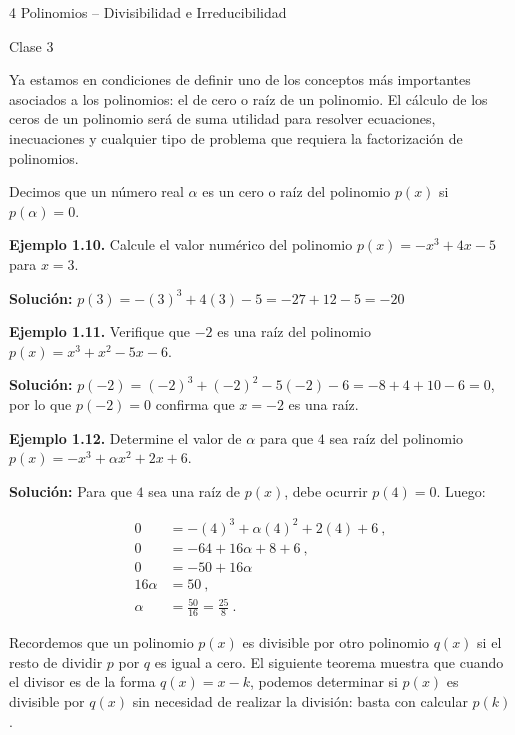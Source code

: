 \documentclass[11pt]{article}
\theoremstyle{plain}
\theoremstyle{definition}
\theoremstyle{definition}
\begin{document}
\begin{multicols}{4}
Polinomios – Divisibilidad e Irreducibilidad

Clase 3

Ya estamos en condiciones de definir uno de los conceptos más importantes asociados a los polinomios: el de cero o raíz de un polinomio. El cálculo de los ceros de un polinomio será de suma utilidad para resolver ecuaciones, inecuaciones y cualquier tipo de problema que requiera la factorización de polinomios.

\begin{tcolorbox}[colback=blue!5!white,colframe=blue!75!black,title=\textbf{Definición (Cero o raíz de un polinomio)}]
Decimos que un número real $\alpha$ es un cero o raíz del polinomio $p(x)$ si $p(\alpha) = 0$.
\end{tcolorbox}

\noindent\textbf{Ejemplo 1.10.} Calcule el valor numérico del polinomio $p(x) = -x^3 + 4x - 5$ para $x = 3$.

\noindent\textbf{Solución:}
$p(3) = -(3)^3 + 4(3) - 5 = -27 + 12 - 5 = -20$

\noindent\textbf{Ejemplo 1.11.} Verifique que $-2$ es una raíz del polinomio $p(x) = x^3 + x^2 - 5x - 6$.

\noindent\textbf{Solución:}
$p(-2) = (-2)^3 + (-2)^2 - 5(-2) - 6 = -8 + 4 + 10 - 6 = 0$, por lo que $p(-2)=0$ confirma que $x=-2$ es una raíz.

\noindent\textbf{Ejemplo 1.12.} Determine el valor de $\alpha$ para que $4$ sea raíz del polinomio $p(x) = -x^3 + \alpha x^2 + 2x + 6$.

\noindent\textbf{Solución:} Para que $4$ sea una raíz de $p(x)$, debe ocurrir $p(4) = 0$. Luego:

\begin{align*}
0 &= -(4)^3 + \alpha (4)^2 + 2(4) + 6~,\\
0 &= -64 + 16\alpha + 8 + 6~,\\
0 &= -50 + 16\alpha~\\
16\alpha &= 50~,\\
\alpha &= \frac{50}{16} = \frac{25}{8}~.
\end{align*}

Recordemos que un polinomio $p(x)$ es divisible por otro polinomio $q(x)$ si el resto de dividir $p$ por $q$ es igual a cero. El siguiente teorema muestra que cuando el divisor es de la forma $q(x) = x - k$, podemos determinar si $p(x)$ es divisible por $q(x)$ sin necesidad de realizar la división: basta con calcular $p(k)$.


\end{multicols}
\end{document}
